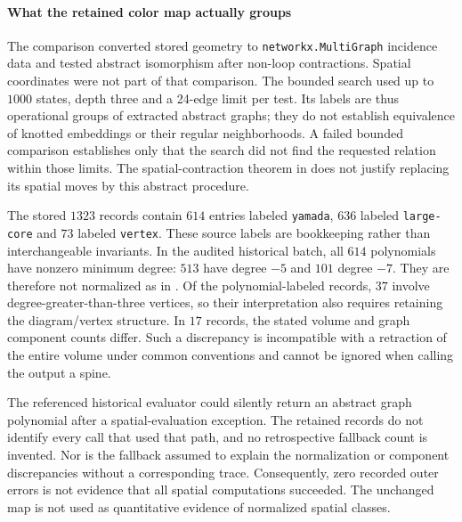 \paragraph{What the retained color map actually groups}
The comparison converted stored geometry to \texttt{networkx.MultiGraph} incidence data and tested abstract isomorphism after non-loop contractions. Spatial coordinates were not part of that comparison. The bounded search used up to $1000$ states, depth three and a 24-edge limit per test. Its labels are thus operational groups of extracted abstract graphs; they do not establish equivalence of knotted embeddings or their regular neighborhoods. A failed bounded comparison establishes only that the search did not find the requested relation within those limits. The spatial-contraction theorem in  does not justify replacing its spatial moves by this abstract procedure.

The stored $1323$ records contain $614$ entries labeled \texttt{yamada}, $636$ labeled \texttt{large-core} and $73$ labeled \texttt{vertex}. These source labels are bookkeeping rather than interchangeable invariants. In the audited historical batch, all $614$ polynomials have nonzero minimum degree: $513$ have degree $-5$ and $101$ degree $-7$. They are therefore not normalized as in . Of the polynomial-labeled records, $37$ involve degree-greater-than-three vertices, so their interpretation also requires retaining the diagram/vertex structure. In $17$ records, the stated volume and graph component counts differ. Such a discrepancy is incompatible with a retraction of the entire volume under common conventions and cannot be ignored when calling the output a spine.

The referenced historical evaluator could silently return an abstract graph polynomial after a spatial-evaluation exception. The retained records do not identify every call that used that path, and no retrospective fallback count is invented. Nor is the fallback assumed to explain the normalization or component discrepancies without a corresponding trace. Consequently, zero recorded outer errors is not evidence that all spatial computations succeeded. The unchanged map is not used as quantitative evidence of normalized spatial classes.

